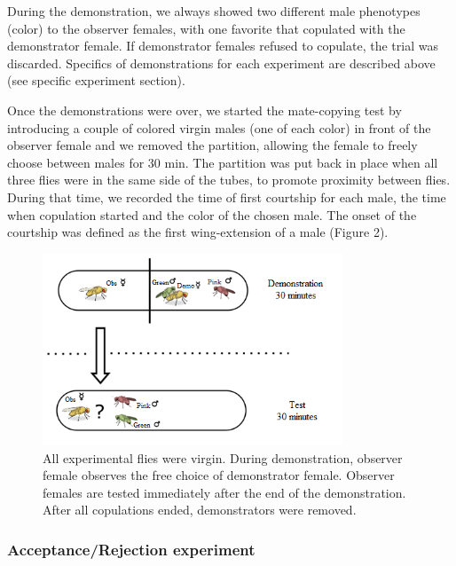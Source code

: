\documentclass[a4paper, 12pt]{article}
\begin{document}
	During the demonstration, we always showed two different male phenotypes (color) to the observer females, with one favorite that copulated with the demonstrator female. If demonstrator females refused to copulate, the trial was discarded. Specifics of demonstrations for each experiment are described above (see specific experiment section).
	
	Once the demonstrations were over, we started the mate-copying test by introducing a couple of colored virgin males (one of each color) in front of the observer female and we removed the partition, allowing the female to freely choose between males for 30 min. The partition was put back in place when all three flies were in the same side of the tubes, to promote proximity between flies. During that time, we recorded the time of first courtship for each male, the time when copulation started and the color of the chosen male. The onset of the courtship was defined as the first wing-extension of a male (Figure 2).
	
	
	
	
	
	\bigskip
	\begin{figure}[h]
	\vspace{5cm}
	\centering
	\includegraphics[width=0.8\textwidth]{images/classic}
	\caption{All experimental flies were virgin. During demonstration, observer female observes the free choice of demonstrator female. Observer females are tested immediately after the end of the demonstration. After all copulations ended, demonstrators were removed.}
	\label{fig:Classic protocol}
	\end{figure}

\clearpage

	\subsubsection{Acceptance/Rejection experiment}
	
\end{document}
